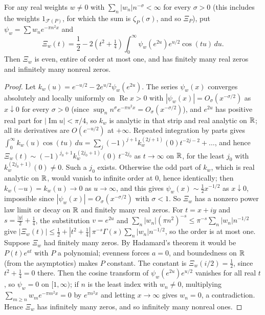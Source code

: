 \begin{theorem}\label{mi:thm:noproxy}
For any real weights $w\ne0$ with $\sum_n|w_n|n^{-\sigma}<\infty$ for every $\sigma>0$ (this includes the weights $1_{\mathcal F(P)}$, for which the sum is $\zeta_P(\sigma)$, and so $\Xi_P$), put $\psi_w=\sum w_ne^{-\pi n^2x}$ and
\[
\Xi_w(t)=\frac12-2\left(t^2+\tfrac14\right)\int_0^\infty\psi_w(e^{2u})e^{u/2}\cos(tu)\,du.
\]
Then $\Xi_w$ is even, entire of order at most one, and has finitely many real zeros and infinitely many nonreal zeros.
\end{theorem}

\begin{proof}
Let $k_w(u)=e^{-u/2}-2e^{u/2}\psi_w(e^{2u})$. The series $\psi_w(x)$ converges absolutely and locally uniformly on $\operatorname{Re}x>0$ with $|\psi_w(x)|=O_\sigma(x^{-\sigma/2})$ as $x\downarrow0$ for every $\sigma>0$ (since $\sup_nn^\sigma e^{-\pi n^2x}=O_\sigma(x^{-\sigma/2})$), and $e^{2u}$ has positive real part for $|\operatorname{Im}u|<\pi/4$, so $k_w$ is analytic in that strip and real analytic on $\mathbb{R}$; all its derivatives are $O(e^{-u/2})$ at $+\infty$. Repeated integration by parts gives $\int_0^\infty k_w(u)\cos(tu)\,du=\sum_j(-1)^{j+1}k_w^{(2j+1)}(0)t^{-2j-2}+\dots$, and hence $\Xi_w(t)\sim(-1)^{j_0+1}k_w^{(2j_0+1)}(0)\,t^{-2j_0}$ as $t\to\infty$ on $\mathbb{R}$, for the least $j_0$ with $k_w^{(2j_0+1)}(0)\ne0$. Such a $j_0$ exists. Otherwise the odd part of $k_w$, which is real analytic on $\mathbb{R}$, would vanish to infinite order at $0$, hence identically; then $k_w(-u)=k_w(u)\to0$ as $u\to\infty$, and this gives $\psi_w(x)\sim\tfrac12x^{-1/2}$ as $x\downarrow0$, impossible since $|\psi_w(x)|=O_\sigma(x^{-\sigma/2})$ with $\sigma<1$. So $\Xi_w$ has a nonzero power law limit or decay on $\mathbb{R}$ and finitely many real zeros. For $t=x+iy$ and $s=\tfrac{|y|}2+\tfrac14$, the substitution $v=e^{2u}$ and $\sum_n|w_n|(\pi n^2)^{-s}\le\pi^{-s}\sum_n|w_n|n^{-1/2}$ give $|\Xi_w(t)|\le\tfrac12+|t^2+\tfrac14|\,\pi^{-s}\Gamma(s)\sum_n|w_n|n^{-1/2}$, so the order is at most one. Suppose $\Xi_w$ had finitely many zeros. By Hadamard's theorem it would be $P(t)e^{at}$ with $P$ a polynomial; evenness forces $a=0$, and boundedness on $\mathbb{R}$ (from the asymptotics) makes $P$ constant. The constant is $\Xi_w(i/2)=\tfrac12$, since $t^2+\tfrac14=0$ there. Then the cosine transform of $\psi_w(e^{2u})e^{u/2}$ vanishes for all real $t$, so $\psi_w=0$ on $[1,\infty)$; if $n$ is the least index with $w_n\ne0$, multiplying $\sum_{m\ge n}w_me^{-\pi m^2x}=0$ by $e^{\pi n^2x}$ and letting $x\to\infty$ gives $w_n=0$, a contradiction. Hence $\Xi_w$ has infinitely many zeros, and so infinitely many nonreal ones.
\end{proof}


